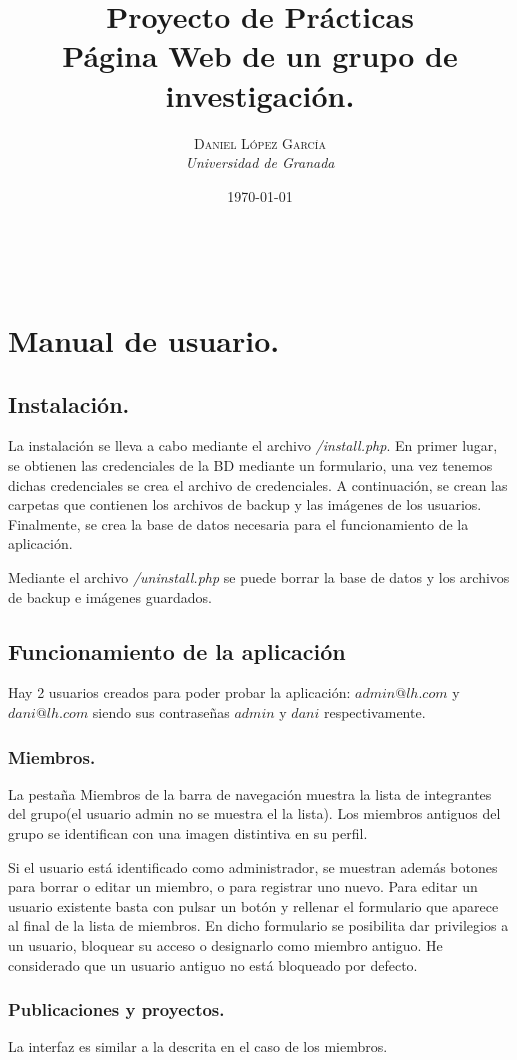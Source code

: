 \documentclass[a4paper, 11pt]{article} %
\title{\textbf{Proyecto de Prácticas}\\ %
\vspace{20 pt}Página Web de un grupo de investigación.
} %
\author{\textsc{Daniel López García} %
\\{\textit{Universidad de Granada}}} %
\date{\today} %
\makeatletter
\renewcommand{\maketitle}{ %
	\begin{center} %
		{\Huge\@title} %
	\end{center}
	
	\vspace{20pt} %
	
	\begin{flushright} %
		{\large\@author} %
		\\\@date %
		
		\vspace{40pt} %
	\end{flushright}
	\renewcommand{\baselinestretch}{0.5}
	
}
\makeatother
\begin{document}
	\maketitle
\section{Manual de usuario.}
\subsection{Instalación.}
La instalación se lleva a cabo mediante el archivo \emph{/install.php}. En primer lugar, se obtienen las credenciales de la BD mediante un formulario, una vez tenemos dichas credenciales se crea el archivo de credenciales. A continuación, se crean las carpetas que contienen los archivos de backup y las imágenes de los usuarios. Finalmente, se crea la base de datos necesaria para el funcionamiento de la aplicación.

Mediante el archivo \emph{/uninstall.php} se puede borrar la base de datos y los archivos de backup e imágenes guardados.

\subsection{Funcionamiento de la aplicación}Hay 2 usuarios creados para poder probar la aplicación: $admin@lh.com$ y $dani@lh.com$ siendo sus contraseñas $admin$ y $dani$ respectivamente. 
\subsubsection{Miembros.} La pestaña Miembros de la barra de navegación muestra la lista de integrantes del grupo(el usuario admin no se muestra el la lista). Los miembros antiguos del grupo se identifican con una imagen distintiva en su perfil. 

\medskip

Si el usuario está identificado como administrador, se muestran además botones para borrar o editar un miembro, o para registrar uno nuevo. Para editar un usuario existente basta con pulsar un botón y rellenar el formulario que aparece al final de la lista de miembros. En dicho formulario se posibilita dar privilegios a un usuario, bloquear su acceso o designarlo como miembro antiguo. He considerado que un usuario antiguo no está bloqueado por defecto.

\subsubsection{Publicaciones y proyectos.} La interfaz es similar a la descrita en el caso de los miembros.
\end{document}
